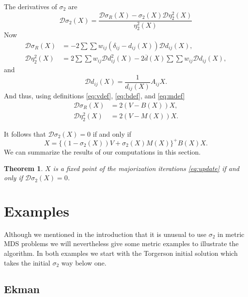 \documentclass[
  12pt,
]{article}
\newtheorem{theorem}{Theorem}[section]
\theoremstyle{definition}
\theoremstyle{definition}
\theoremstyle{definition}
\theoremstyle{definition}
\theoremstyle{remark}
\begin{document}
The derivatives of \(\sigma_2\) are
\begin{equation}
\mathcal{D}\sigma_2(X)=\frac{\mathcal{D}\sigma_R(X)-\sigma_2(X)\mathcal{D}\eta^2_2(X)}{
\eta_2^2(X)}
\label{eq:s2deriv}
\end{equation}
Now
\begin{subequations}
\begin{align}
\mathcal{D}\sigma_R(X)&=-2\sum\sum w_{ij}(\delta_{ij}-d_{ij}(X))\mathcal{D}d_{ij}(X),\\
\mathcal{D}\eta_2^2(X)&=2\sum\sum w_{ij}\mathcal{D}d_{ij}^2(X) -2\overline{d}(X)\sum\sum w_{ij}\mathcal{D}d_{ij}(X),
\end{align}
\end{subequations}
and
\begin{equation}
\mathcal{D}d_{ij}(X)=\frac{1}{d_{ij}(X)}A_{ij}X.
\label{eq:dderiv}
\end{equation}
And thus, using definitions \eqref{eq:vdef}, \eqref{eq:bdef}, and \eqref{eq:mdef}
\begin{subequations}
\begin{align}
\mathcal{D}\sigma_R(X)&=2(V-B(X))X,\\
\mathcal{D}\eta_2^2(X)&=2(V-M(X))X.
\end{align}
\end{subequations}

It follows that \(\mathcal{D}\sigma_2(X)=0\) if and only if
\begin{equation}
X=\{(1-\sigma_2(X))V+\sigma_2(X)M(X)\}^+B(X)X.
\label{eq:stationary}
\end{equation}
We can summarize the results of our computations in this section.

\begin{theorem}
\(X\) is a fixed point of the majorization iterations \eqref{eq:update} if and only if \(\mathcal{D}\sigma_2(X)=0\).
\end{theorem}

\section{Examples}\label{examples}

Although we mentioned in the introduction that it is unusual to use
\(\sigma_2\) in metric MDS problems we will nevertheless give some metric
examples to illustrate the algorithm. In both examples we start with
the Torgerson initial solution which takes the initial \(\sigma_2\) way below
one.

\subsection{Ekman}\label{ekman}
\end{document}
